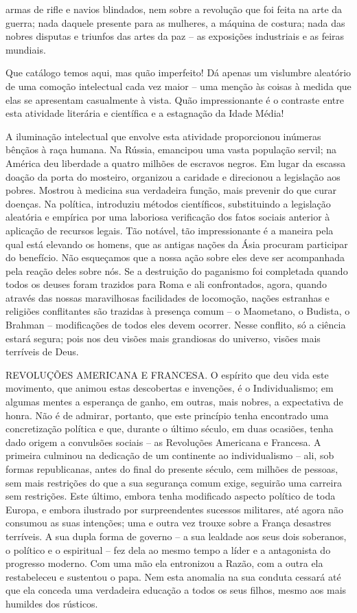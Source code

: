 \documentclass[11pt,a5paper,twoside,openany]{book}
\begin{document}
armas de rifle e navios blindados, nem sobre a revolução que foi feita na arte da guerra; nada daquele presente para as mulheres, a máquina de costura; nada das nobres disputas e triunfos das artes da paz – as exposições industriais e as feiras mundiais.

Que catálogo temos aqui, mas quão imperfeito! Dá apenas um vislumbre aleatório de uma comoção intelectual cada vez maior – uma menção às coisas à medida que elas se apresentam casualmente à vista. Quão impressionante é o contraste entre esta atividade literária e científica e a estagnação da Idade Média!

A iluminação intelectual que envolve esta atividade proporcionou inúmeras bênçãos à raça humana. Na Rússia, emancipou uma vasta população servil; na América deu liberdade a quatro milhões de escravos negros. Em lugar da escassa doação da porta do mosteiro, organizou a caridade e direcionou a legislação aos pobres. Mostrou à medicina sua verdadeira função, mais prevenir do que curar doenças. Na política, introduziu métodos científicos, substituindo a legislação aleatória e empírica por uma laboriosa verificação dos fatos sociais anterior à aplicação de recursos legais. Tão notável, tão impressionante é a maneira pela qual está elevando os homens, que as antigas nações da Ásia procuram participar do benefício. Não esqueçamos que a nossa ação sobre eles deve ser acompanhada pela reação deles sobre nós. Se a destruição do paganismo foi completada quando todos os deuses foram trazidos para Roma e ali confrontados, agora, quando através das nossas maravilhosas facilidades de locomoção, nações estranhas e religiões conflitantes são trazidas à presença comum – o Maometano, o Budista, o Brahman – modificações de todos eles devem ocorrer. Nesse conflito, só a ciência estará segura; pois nos deu visões mais grandiosas do universo, visões mais terríveis de Deus.

REVOLUÇÕES AMERICANA E FRANCESA. O espírito que deu vida este movimento, que animou estas descobertas e invenções, é o Individualismo; em algumas mentes a esperança de ganho, em outras, mais nobres, a expectativa de honra. Não é de admirar, portanto, que este princípio tenha encontrado uma concretização política e que, durante o último século, em duas ocasiões, tenha dado origem a convulsões sociais – as Revoluções Americana e Francesa. A primeira culminou na dedicação de um continente ao individualismo – ali, sob formas republicanas, antes do final do presente século, cem milhões de pessoas, sem mais restrições do que a sua segurança comum exige, seguirão uma carreira sem restrições. Este último, embora tenha modificado aspecto político de toda Europa, e embora ilustrado por surpreendentes sucessos militares, até agora não consumou as suas intenções; uma e outra vez trouxe sobre a França desastres terríveis. A sua dupla forma de governo – a sua lealdade aos seus dois soberanos, o político e o espiritual – fez dela ao mesmo tempo a líder e a antagonista do progresso moderno. Com uma mão ela entronizou a Razão, com a outra ela restabeleceu e sustentou o papa. Nem esta anomalia na sua conduta cessará até que ela conceda uma verdadeira educação a todos os seus filhos, mesmo aos mais humildes dos rústicos.
\end{document}

